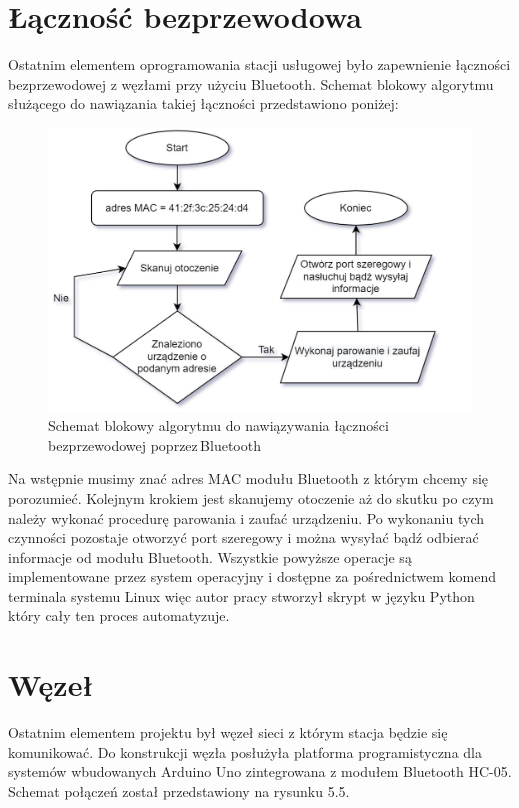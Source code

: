 \documentclass[12pt, twoside, openany]{mwrep}
\begin{document}
\section{Łączność bezprzewodowa}
Ostatnim elementem oprogramowania stacji usługowej było zapewnienie łączności bezprzewodowej z węzłami przy użyciu Bluetooth. Schemat blokowy algorytmu służącego do nawiązania takiej łączności przedstawiono poniżej:
\begin{figure}[H]
\centering
\includegraphics[scale=0.4]{algorytm}
\caption{Schemat blokowy algorytmu do nawiązywania łączności bezprzewodowej poprzez\,Bluetooth}
\end{figure}
\par
Na wstępnie musimy znać adres MAC modułu Bluetooth z którym chcemy się porozumieć. Kolejnym krokiem jest skanujemy otoczenie aż do skutku po czym należy wykonać procedurę parowania i zaufać urządzeniu. Po wykonaniu tych czynności pozostaje otworzyć port szeregowy i można wysyłać bądź odbierać informacje od modułu Bluetooth. Wszystkie powyższe operacje są implementowane przez system operacyjny i dostępne za pośrednictwem komend terminala systemu Linux więc autor pracy stworzył skrypt w języku Python który cały ten proces automatyzuje.

\section{Węzeł}
Ostatnim elementem projektu był węzeł sieci z którym stacja będzie się komunikować. Do konstrukcji węzła posłużyła platforma programistyczna dla systemów wbudowanych Arduino Uno zintegrowana z modułem Bluetooth HC-05. Schemat połączeń został przedstawiony na rysunku 5.5.
\end{document}
